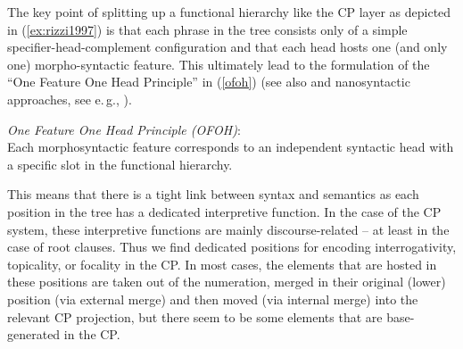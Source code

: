 \begin{exe}
\ex\label{ex:rizzi1997} 
\end{exe}

\noindent The key point of splitting up a functional hierarchy like the CP layer as depicted in (\ref{ex:rizzi1997}) is that each phrase in the tree consists only of a simple specifier-head-complement configuration and that each head hosts one (and only one) morpho-syntactic feature. This ultimately lead to the formulation of the ``One Feature One Head Principle'' \citep[45]{cinque2008cartography} in (\ref{ofoh}) (see also \citealt{kayne2005some} and nanosyntactic approaches, see e.\,g., \citealt{starke2009nanosyntax}).

\begin{exe}
\ex \textit{One Feature One Head Principle (OFOH)}:  \\
Each morphosyntactic feature corresponds to an independent syntactic head with a specific slot in the functional hierarchy.\label{ofoh}
\end{exe}

\noindent This means that there is a tight link between syntax and semantics as each position in the tree has a dedicated interpretive function. In the case of the CP system, these interpretive functions are mainly discourse-related -- at least in the case of root clauses. Thus we find dedicated positions for encoding interrogativity, topicality, or focality in the CP. In most cases, the elements that are hosted in these positions are taken out of the numeration, merged in their original (lower) position (via external merge) and then moved (via internal merge) into the relevant CP projection, but there seem to be some elements that are base-generated in the CP. 

